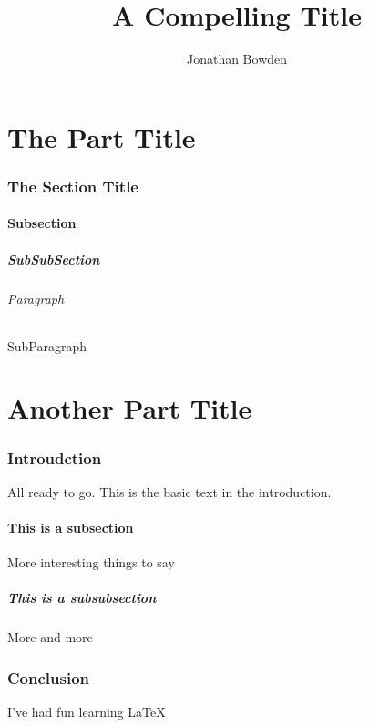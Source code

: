 \documentclass{article}
\title{A Compelling Title}
\author{Jonathan Bowden}
\begin{document}
\maketitle



\part{The Part Title}
\section {The Section Title}
\subsection {Subsection}
\subsubsection {SubSubSection}
\paragraph {Paragraph}
\subparagraph {SubParagraph}

\part{Another Part Title}
\section{Introudction}


All ready to go. This is the basic text in the introduction.

\subsection{This is a subsection}

More interesting things to say

\subsubsection{This is a subsubsection}

More and more

\section{Conclusion}

I've had fun learning \LaTeX
\end{document}
